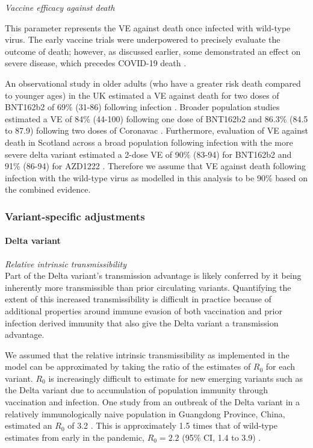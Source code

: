 \textit{Vaccine efficacy against death}

This parameter represents the VE against death once infected with wild-type virus.
The early vaccine trials were underpowered to precisely evaluate the outcome of death; however, as discussed earlier, some 
demonstrated an effect on severe disease, which precedes COVID-19 death \cite{elsahly2021, thomas2021, ella2021, alkaabi2021}.

An observational study in older adults (who have a greater risk death compared to younger ages) in the UK estimated a VE against death 
for two doses of BNT162b2 of 69\% (31-86) following infection \cite{lopez2021}. Broader population studies estimated a VE of 
84\% (44-100) following one dose of BNT162b2 and 86.3\% (84.5 to 87.9) following two doses of Coronavac \cite{dagan2021, jara2021}. 
Furthermore, evaluation of VE against death in Scotland across a broad population following infection with the more severe delta variant estimated a 2-dose VE of 90\% (83-94) for BNT162b2 and 91\% (86-94) for AZD1222 \cite{sheikh2021}. 
Therefore we assume that VE against death following infection with the wild-type virus as modelled in this analysis to be 90\% based on the combined evidence.

\subsubsection{Variant-specific adjustments}
\label{strain_params}
\paragraph{Delta variant}

\textit{Relative intrinsic transmissibility}\\
Part of the Delta variant's transmission advantage is likely conferred by it being inherently more transmissible than prior circulating 
variants. Quantifying the extent of this increased transmissibility is difficult in practice because of additional properties around immune 
evasion of both vaccination and prior infection derived immunity that also give the Delta variant a transmission advantage.

We assumed that the relative intrinsic transmissibility as implemented in the model can be approximated by taking the ratio of the estimates 
of $R_0$ for each variant. $R_0$ is increasingly difficult to estimate for new emerging variants such as the Delta variant due to accumulation of 
population immunity through vaccination and infection. One study from an outbreak of the Delta variant in a relatively immunologically naive population 
in Guangdong Province, China, estimated an $R_{0}$ of 3.2 \cite{meng2021}. This is approximately 1.5 times that of wild-type estimates from early in the 
pandemic, $R_0=2.2$ (95\% CI, 1.4 to 3.9) \cite{li2020}. 

